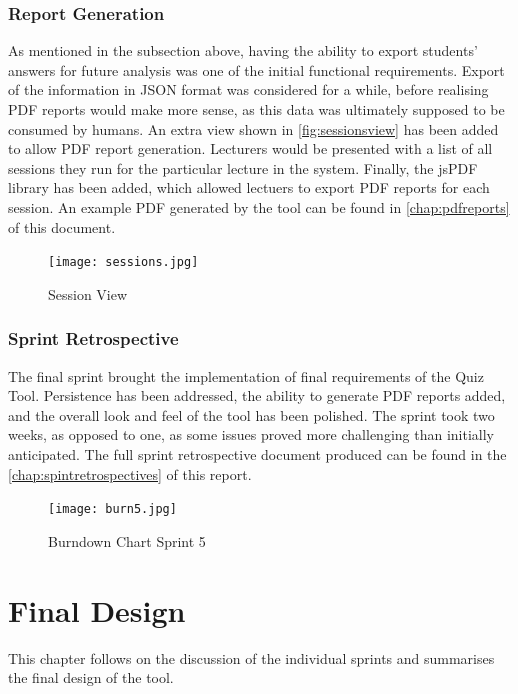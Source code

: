 \subsection{Report Generation}
As mentioned in the subsection above, having the ability to export students' answers
for future analysis was one of the initial functional requirements. Export of
the information in JSON format was considered for a while, before realising PDF reports would
make more sense, as this data was ultimately supposed to be consumed by humans.
An extra view shown in \autoref{fig:sessionsview} has been added to allow PDF report generation.
Lecturers would be presented with a list of all sessions they run for the particular
lecture in the system. Finally, the jsPDF\cite{57} library has been added, which allowed
lectuers to export PDF reports for each session. An example PDF generated by the
tool can be found in \autoref{chap:pdfreports} of this document.

\begin{figure}[h!]
    \centering
    \texttt{[image: sessions.jpg]}
    \caption{Session View}
    \label{fig:sessionsview}
\end{figure}

\newpage
\subsection{Sprint Retrospective}
The final sprint brought the implementation of final requirements of the Quiz Tool.
Persistence has been addressed, the ability to generate PDF reports added, and
the overall look and feel of the tool has been polished. The sprint took two weeks,
as opposed to one, as some issues proved more challenging than initially anticipated.
The full sprint retrospective document produced can be found in the
\autoref{chap:spintretrospectives} of this report.

\begin{figure}[h!]
    \centering
    \texttt{[image: burn5.jpg]}
    \caption{Burndown Chart Sprint 5}
    \label{fig:burn5}
\end{figure}

\chapter{Final Design}
This chapter follows on the discussion of the individual sprints and summarises
the final design of the tool.



